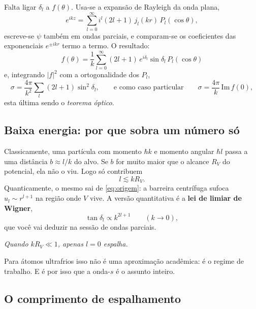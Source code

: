 \documentclass[11pt,a4paper]{article}
\begin{document}
Falta ligar $\delta_{l}$ a $f(\theta)$. Usa-se a expansão de Rayleigh da onda plana,
\begin{equation}
e^{ikz} = \sum_{l=0}^{\infty} i^{l}(2l+1)\,j_{l}(kr)\,P_{l}(\cos\theta),
\end{equation}
escreve-se $\psi$ também em ondas parciais, e comparam-se os coeficientes das
exponenciais $e^{\pm ikr}$ termo a termo. O resultado:
\begin{equation}
\boxed{\;f(\theta) = \frac{1}{k}\sum_{l=0}^{\infty}(2l+1)\,e^{i\delta_{l}}\sin\delta_{l}\,P_{l}(\cos\theta)\;}
\end{equation}
e, integrando $|f|^{2}$ com a ortogonalidade dos $P_{l}$,
\begin{equation}
\sigma = \frac{4\pi}{k^{2}}\sum_{l}(2l+1)\sin^{2}\delta_{l},
\qquad\text{e como caso particular}\qquad
\sigma = \frac{4\pi}{k}\,\mathrm{Im}\,f(0),
\end{equation}
esta última sendo o \emph{teorema óptico}.

\subsection{Baixa energia: por que sobra um número só}

Classicamente, uma partícula com momento $\hbar k$ e momento angular $\hbar l$ passa a
uma distância $b\approx l/k$ do alvo. Se $b$ for muito maior que o alcance $R_{V}$ do
potencial, ela não o viu. Logo só contribuem
\begin{equation}
l \lesssim k R_{V}.
\end{equation}
Quanticamente, o mesmo sai de \eqref{eq:origem}: a barreira centrífuga sufoca
$u_{l}\sim r^{l+1}$ na região onde $V$ vive. A versão quantitativa é a
\textbf{lei de limiar de Wigner},
\begin{equation}
\tan\delta_{l} \propto k^{2l+1}\qquad (k\to0),
\end{equation}
que você vai deduzir na sessão de ondas parciais.

\begin{center}
\emph{Quando $kR_{V}\ll1$, apenas $l=0$ espalha.}
\end{center}

Para átomos ultrafrios isso não é uma aproximação acadêmica: é o regime de trabalho.
E é por isso que a onda-$s$ é o assunto inteiro.

\subsection{O comprimento de espalhamento}
\end{document}
